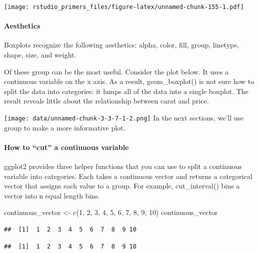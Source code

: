 \documentclass[
]{article}
\newenvironment{Shaded}{\begin{snugshade}}{\end{snugshade}}
\newcommand{\DecValTok}[1]{\textcolor[rgb]{0.00,0.00,0.81}{#1}}
\newcommand{\FunctionTok}[1]{\textcolor[rgb]{0.00,0.00,0.00}{#1}}
\newcommand{\NormalTok}[1]{#1}
\newcommand{\OtherTok}[1]{\textcolor[rgb]{0.56,0.35,0.01}{#1}}
\begin{document}
\texttt{[image: rstudio\_primers\_files/figure-latex/unnamed-chunk-155-1.pdf]}

\hypertarget{aesthetics-3}{%
\paragraph{Aesthetics}\label{aesthetics-3}}

Boxplots recognize the following aesthetics: alpha, color, fill, group,
linetype, shape, size, and weight.

Of these group can be the most useful. Consider the plot below. It uses
a continuous variable on the x axis. As a result, geom\_boxplot() is not
sure how to split the data into categories: it lumps all of the data
into a single boxplot. The result reveals little about the relationship
between carat and price.

\texttt{[image: data/unnamed-chunk-3-3-7-1-2.png]} In the next sections,
we'll use group to make a more informative plot.

\hypertarget{how-to-cut-a-continuous-variable}{%
\paragraph{How to ``cut'' a continuous
variable}\label{how-to-cut-a-continuous-variable}}

ggplot2 provides three helper functions that you can use to split a
continuous variable into categories. Each takes a continuous vector and
returns a categorical vector that assigns each value to a group. For
example, cut\_interval() bins a vector into n equal length bins.

\begin{Shaded}
\begin{Highlighting}[]
\NormalTok{continuous\_vector }\OtherTok{\textless{}{-}} \FunctionTok{c}\NormalTok{(}\DecValTok{1}\NormalTok{, }\DecValTok{2}\NormalTok{, }\DecValTok{3}\NormalTok{, }\DecValTok{4}\NormalTok{, }\DecValTok{5}\NormalTok{, }\DecValTok{6}\NormalTok{, }\DecValTok{7}\NormalTok{, }\DecValTok{8}\NormalTok{, }\DecValTok{9}\NormalTok{, }\DecValTok{10}\NormalTok{)}
\NormalTok{continuous\_vector}
\end{Highlighting}
\end{Shaded}

\begin{verbatim}
##  [1]  1  2  3  4  5  6  7  8  9 10
\end{verbatim}

\begin{verbatim}
##  [1]  1  2  3  4  5  6  7  8  9 10
\end{verbatim}
\end{document}

